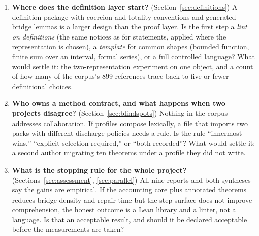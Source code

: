 \documentclass[11pt,a4paper]{article}
\newcommand{\code}[1]{\texttt{\detokenize{#1}}}
\theoremstyle{definition}
\begin{document}
\begin{enumerate}[label=\textbf{Q\arabic*.},itemsep=.55em]
\item \textbf{Where does the definition layer start?} (Section~\ref{sec:definitions}) A definition package with coercion and totality conventions and generated bridge lemmas is a larger design than the proof layer. Is the first step a \emph{lint on definitions} (the same notices as for statements, applied where the representation is chosen), a \emph{template} for common shapes (bounded function, finite sum over an interval, formal series), or a full controlled language? What would settle it: the two-representation experiment on one object, and a count of how many of the corpus's 899 \code{Nat.cast} references trace back to five or fewer definitional choices.

\item \textbf{Who owns a method contract, and what happens when two projects disagree?} (Section~\ref{sec:blindspots}) Nothing in the corpus addresses collaboration. If profiles compose lexically, a file that imports two packs with different discharge policies needs a rule. Is the rule ``innermost wins,'' ``explicit selection required,'' or ``both recorded''? What would settle it: a second author migrating ten theorems under a profile they did not write.

\item \textbf{What is the stopping rule for the whole project?} (Sections~\ref{sec:assessment}, \ref{sec:parallel}) All nine reports and both syntheses say the gains are empirical. If the accounting core plus annotated theorems reduces bridge density and repair time but the step surface does not improve comprehension, the honest outcome is a Lean library and a linter, not a language. Is that an acceptable result, and should it be declared acceptable before the measurements are taken?
\end{enumerate}
\end{document}
